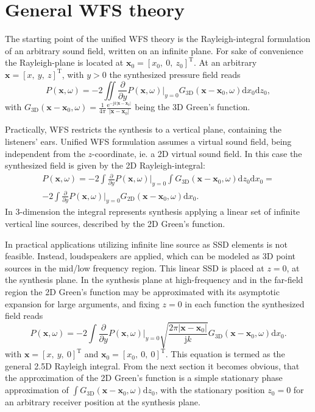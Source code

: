 \documentclass[12pt,a4paper]{article}
\newcommand{\td}{\mathrm{d}}
\newcommand{\te}{\mathrm{e}}
\newcommand{\ti}{\mathrm{j}}
\newcommand{\vx}{\mathbf{x}}
\newcommand{\vxo}{\mathbf{x}_0}
\begin{document}
\section{General WFS theory}
The starting point of the unified WFS theory is the Rayleigh-integral formulation of an arbitrary sound field, written on an infinite plane. For sake of convenience the Rayleigh-plane is located at $\vxo = [x_0,\ 0,\ z_0]^{\mathrm{T}}$. At an arbitrary $\vx = [x,\ y,\ z]^{\mathrm{T}}$, with $y>0$ the synthesized pressure field reads
\begin{equation}
P(\vx,\omega) = -2 \iint \frac{\partial}{\partial y} \left. P(\vx,\omega) \right|_{y = 0} G_{3\mathrm{D}}(\vx - \vxo,\omega) \td x_0 \td z_0,
\label{Eq:Theory:3D_Rayleigh}
\end{equation}
with $G_{3\mathrm{D}}(\vx - \vxo,\omega) = \frac{1}{4\pi} \frac{\te^{-\ti k |\vx-\vxo| }}{|\vx-\vxo|}$ being the 3D Green's function.

Practically, WFS restricts the synthesis to a vertical plane, containing the listeners' ears. 
Unified WFS formulation assumes a virtual sound field, being independent from the $z$-coordinate, ie. a 2D virtual sound field. In this case the synthesized field is given by the 2D Rayleigh-integral:
\begin{multline}
P(\vx,\omega) = -2 \int \frac{\partial}{\partial y} \left. P(\vx,\omega) \right|_{y = 0} \int G_{3\mathrm{D}}(\vx - \vxo,\omega) \td z_0 \td x_0 = \\
-2 \int \frac{\partial}{\partial y} \left. P(\vx,\omega) \right|_{y = 0} G_{2\mathrm{D}}(\vx - \vxo,\omega) \td x_0.
\label{Eq:2D_Rayleigh}
\end{multline}
In 3-dimension the integral represents synthesis applying a linear set of infinite vertical line sources, described by the 2D Green's function.

In practical applications utilizing infinite line source as SSD elements is not feasible. Instead, loudspeakers are applied, which can be modeled as 3D point sources in the mid/low frequency region. This linear SSD is placed at $z=0$, at the synthesis plane. In the synthesis plane at high-frequency and in the far-field region the 2D Green's function may be approximated with its asymptotic expansion for large arguments, and fixing $z=0$ in each function the synthesized field reads
\begin{equation}
P(\vx,\omega) = 
-2 \int \frac{\partial}{\partial y} \left. P(\vx,\omega) \right|_{y = 0} \sqrt{\frac{2\pi |\vx-\vxo|}{\ti k}} G_{3\mathrm{D}}(\vx - \vxo,\omega) \td x_0.
\label{Eq:2.5D_Rayleigh}
\end{equation}
with $\vx = [x,\ y,\ 0]^{\mathrm{T}}$ and $\vxo = [x_0,\ 0,\ 0]^{\mathrm{T}}$. This equation is termed as the general 2.5D Rayleigh integral. From the next section it becomes obvious, that the approximation of the 2D Green's function is a simple stationary phase approximation of $\int G_{3\mathrm{D}}(\vx - \vxo,\omega) \td z_0$, with the stationary position $z_0 = 0$ for an arbitrary receiver position at the synthesis plane.
\end{document}

